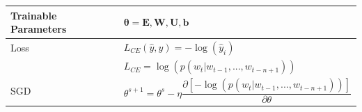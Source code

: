 \begin{table}[H]
    \begin{tabular}{|l|l|}
        \hline
         Trainable Parameters & \(\mathbf{\theta = E,W,U,b}\) \\
         \hline
         Loss & \( L_{CE}(\hat{y}, y) = -\log(\hat{y}_i) \) \\
         & \( L_{CE} = \log(p(w_t|w_{t-1},...,w_{t-n+1})) \) \\
         \hline
         SGD & \begin{minipage}{8cm}
             \vspace{0.2cm}
             \( \theta^{s+1} = \theta^s - \eta\displaystyle\dfrac{\partial[-\log(p(w_t|w_{t-1},...,w_{t-n+1}))]}{\partial\theta} \)
             \vspace{0.2cm}
         \end{minipage}\\
         \hline
    \end{tabular}
\end{table}
































